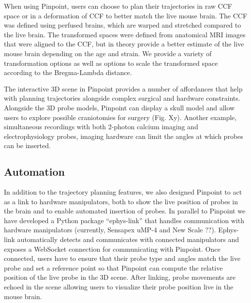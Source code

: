 When using Pinpoint, users can choose to plan their trajectories in raw CCF space or in a deformation of CCF to better match the live mouse brain. The CCF was defined using perfused brains, which are warped and stretched compared to the live brain. The transformed spaces were defined from anatomical MRI images that were aligned to the CCF, but in theory provide a better estimate of the live mouse brain depending on the age and strain. We provide a variety of transformation options as well as options to scale the transformed space according to the Bregma-Lambda distance.


The interactive 3D scene in Pinpoint provides a number of affordances that help with planning trajectories alongside complex surgical and hardware constraints. Alongside the 3D probe models, Pinpoint can display a skull model and allow users to explore possible craniotomies for surgery (Fig. Xy). Another example, simultaneous recordings with both 2-photon calcium imaging and electrophysiology probes, imaging hardware can limit the angles at which probes can be inserted.


\subsection{Automation}


In addition to the trajectory planning features, we also designed Pinpoint to act as a link to hardware manipulators, both to show the live position of probes in the brain and to enable automated insertion of probes. In parallel to Pinpoint we have developed a Python package ``ephys-link'' that handles communication with hardware manipulators (currently, Sensapex uMP-4 and New Scale ??). Ephys-link automatically detects and communicates with connected manipulators and exposes a WebSocket connection for communicating with Pinpoint. Once connected, users have to ensure that their probe type and angles match the live probe and set a reference point so that Pinpoint can compute the relative position of the live probe in the 3D scene. After linking, probe movements are echoed in the scene allowing users to visualize their probe position live in the mouse brain. 


